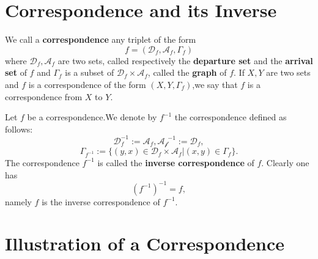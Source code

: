 \documentclass{book}
\numberwithin{equation}{section}
\begin{document}
\section{Correspondence and its Inverse}
\begin{definitionenv}
    We call a \textbf{correspondence} any triplet of the form $$f=(\mathscr{D} _f,\mathscr{A}_f,\Gamma_f)$$
    where $\mathscr{D}_f,\mathscr{A}_f$ are two sets, called respectively the \textbf{departure set }  and the \textbf{arrival set} of $f$ and $\Gamma_f$ is a subset of $\mathscr{D}_f\times \mathscr{A}_f$, called the \textbf{graph} of $f$.
    \newline
    If $X,Y$ are two sets and $f$ is a correspondence of the form $(X,Y,\Gamma_f)$,we say that $f$ is a correspondence from $X$ to $Y$. 
\end{definitionenv}
\begin{definitionenv}
    Let $f$ be a correspondence.We denote by $f^{-1}$ the correspondence defined as follows:
    $$\mathscr{D}_f^{-1}:=\mathscr{A}_f,\mathscr{A_f}^{-1}:=\mathscr{D}_f,$$
    $$\Gamma_{f^{-1}}:=\{(y,x)\in \mathscr{D}_f\times \mathscr{A}_f|(x,y)\in \Gamma_f\}.$$
    The correspondence $f^{-1}$ is called the \textbf{inverse correspondence} of $f$. Clearly one has $$(f^{-1})^{-1}=f,$$
    namely $f$ is the inverse correspondence of $f^{-1}$.
\end{definitionenv}
\section{Illustration of a Correspondence}
\end{document}
